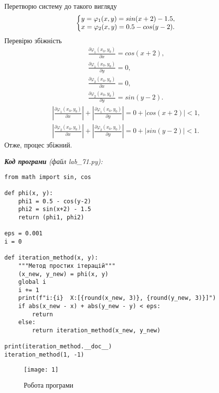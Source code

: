 \documentclass{article}
\newcommand\lab{7}
\begin{document}
\begin{large}
		Перетворю систему до такого вигляду
		\begin{gather}
			\left\{\begin{array}{@{}l@{}}
				y=\varphi_1(x,y) = sin(x+2)-1.5,\\\nonumber
				x=\varphi_2(x,y) = 0.5-cos(y-2).\nonumber
			\end{array}\right.\,
		\end{gather}
		Перевірю збіжність
		\begin{gather}\nonumber
			\frac{\partial \varphi_1(x_0, y_0)}{\partial x} = cos(x+2),\\\nonumber
			\frac{\partial \varphi_1(x_0, y_0)}{\partial y} = 0,\\\nonumber
			\frac{\partial \varphi_2(x_0, y_0)}{\partial x} = 0,\\\nonumber
			\frac{\partial \varphi_2(x_0, y_0)}{\partial y} = sin(y-2).\nonumber
		\end{gather}
		\begin{gather}\nonumber
			|\frac{\partial \varphi_1(x_0, y_0)}{\partial x}| +
			|\frac{\partial \varphi_1(x_0, y_0)}{\partial y}| = 0 + |cos(x+2)| < 1,\\\nonumber
			|\frac{\partial \varphi_2(x_0, y_0)}{\partial x}| +
			|\frac{\partial \varphi_2(x_0, y_0)}{\partial y}| = 0+|sin(y-2)| < 1.\nonumber
		\end{gather}
		Отже, процес збіжний.
			
		\noindent\textit{\textbf{Код програми} (файл lab\_\lab1.py):}
		\begin{lstlisting}
from math import sin, cos

def phi(x, y):
	phi1 = 0.5 - cos(y-2)
	phi2 = sin(x+2) - 1.5
	return (phi1, phi2)

eps = 0.001
i = 0

def iteration_method(x, y):
	"""Метод простих ітерацій"""
	(x_new, y_new) = phi(x, y)
	global i
	i += 1
	print(f"i:{i}  X:[{round(x_new, 3)}, {round(y_new, 3)}]")
	if abs(x_new - x) + abs(y_new - y) < eps: 
		return
	else:
		return iteration_method(x_new, y_new)

print(iteration_method.__doc__)
iteration_method(1, -1)\end{lstlisting}

		\begin{figure}[H]
			\centering
			\texttt{[image: 1]}
			\caption{Робота програми}
		\end{figure}
		

\end{large}
\end{document}
